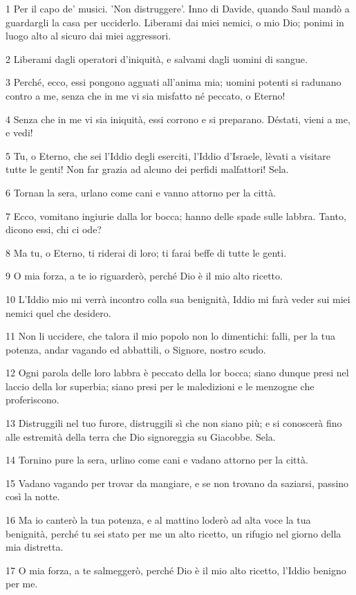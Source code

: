 \par 1 Per il capo de' musici. 'Non distruggere'. Inno di Davide, quando Saul mandò a guardargli la casa per ucciderlo. Liberami dai miei nemici, o mio Dio; ponimi in luogo alto al sicuro dai miei aggressori.
\par 2 Liberami dagli operatori d'iniquità, e salvami dagli uomini di sangue.
\par 3 Perché, ecco, essi pongono agguati all'anima mia; uomini potenti si radunano contro a me, senza che in me vi sia misfatto né peccato, o Eterno!
\par 4 Senza che in me vi sia iniquità, essi corrono e si preparano. Déstati, vieni a me, e vedi!
\par 5 Tu, o Eterno, che sei l'Iddio degli eserciti, l'Iddio d'Israele, lèvati a visitare tutte le genti! Non far grazia ad alcuno dei perfidi malfattori! Sela.
\par 6 Tornan la sera, urlano come cani e vanno attorno per la città.
\par 7 Ecco, vomitano ingiurie dalla lor bocca; hanno delle spade sulle labbra. Tanto, dicono essi, chi ci ode?
\par 8 Ma tu, o Eterno, ti riderai di loro; ti farai beffe di tutte le genti.
\par 9 O mia forza, a te io riguarderò, perché Dio è il mio alto ricetto.
\par 10 L'Iddio mio mi verrà incontro colla sua benignità, Iddio mi farà veder sui miei nemici quel che desidero.
\par 11 Non li uccidere, che talora il mio popolo non lo dimentichi: falli, per la tua potenza, andar vagando ed abbattili, o Signore, nostro scudo.
\par 12 Ogni parola delle loro labbra è peccato della lor bocca; siano dunque presi nel laccio della lor superbia; siano presi per le maledizioni e le menzogne che proferiscono.
\par 13 Distruggili nel tuo furore, distruggili sì che non siano più; e si conoscerà fino alle estremità della terra che Dio signoreggia su Giacobbe. Sela.
\par 14 Tornino pure la sera, urlino come cani e vadano attorno per la città.
\par 15 Vadano vagando per trovar da mangiare, e se non trovano da saziarsi, passino così la notte.
\par 16 Ma io canterò la tua potenza, e al mattino loderò ad alta voce la tua benignità, perché tu sei stato per me un alto ricetto, un rifugio nel giorno della mia distretta.
\par 17 O mia forza, a te salmeggerò, perché Dio è il mio alto ricetto, l'Iddio benigno per me.

